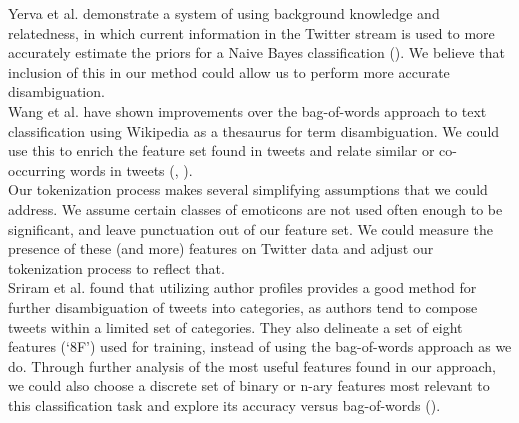 \documentclass[letterpaper]{article}
\begin{document}
Yerva et al. demonstrate a system of using background knowledge and relatedness, in which current information in the Twitter stream is used to more accurately estimate the priors for a Naive Bayes classification (\citeauthor{journals/ijcsa/YervaMA12}). We believe that inclusion of this in our method could allow us to perform more accurate disambiguation.\\

Wang et al. have shown improvements over the bag-of-words approach to text classification using Wikipedia as a thesaurus for term disambiguation. We could use this to enrich the feature set found in tweets and relate similar or co-occurring words in tweets (\citeauthor{Wang:2008:UWC:1510528.1511383}, \citeauthor{Wang:2009:UWK:1554488.1554492}).\\

Our tokenization process makes several simplifying assumptions that we could address. We assume certain classes of emoticons are not used often enough to be significant, and leave punctuation out of our feature set. We could measure the presence of these (and more) features on Twitter data and adjust our tokenization process to reflect that.\\

Sriram et al. found that utilizing author profiles provides a good method for further disambiguation of tweets into categories, as authors tend to compose tweets within a limited set of categories. They also delineate a set of eight features (`8F') used for training, instead of using the bag-of-words approach as we do. Through further analysis of the most useful features found in our approach, we could also choose a discrete set of binary or n-ary features most relevant to this classification task and explore its accuracy versus bag-of-words (\citeauthor{Sriram:2010:STC:1835449.1835643}).




\end{document}
